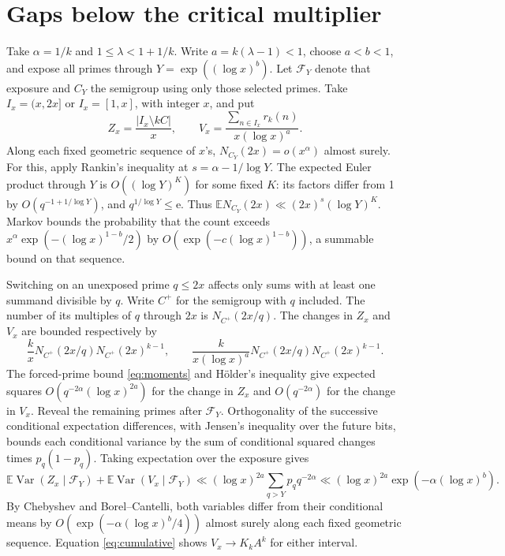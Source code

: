 \documentclass[11pt]{article}
\newcommand{\E}{\mathbb E}
\newcommand{\Var}{\operatorname{Var}}
\newcommand{\e}{\mathrm e}
\begin{document}
\section{Gaps below the critical multiplier}\label{sec:below}

Take \(\alpha=1/k\) and \(1\le\lambda<1+1/k\). Write
\(a=k(\lambda-1)<1\), choose \(a<b<1\), and expose all primes
through \(Y=\exp((\log x)^b)\). Let \(\mathcal F_Y\) denote that
exposure and \(C_Y\) the semigroup using only those selected
primes. Take \(I_x=(x,2x]\) or \(I_x=[1,x]\), with integer \(x\),
and put
\[
 Z_x=\frac{|I_x\setminus kC|}{x},\qquad
 V_x=\frac{\sum_{n\in I_x}r_k(n)}{x(\log x)^a}.
\]
Along each fixed geometric sequence of \(x\)'s,
\(N_{C_Y}(2x)=o(x^\alpha)\) almost surely. For this, apply
Rankin's inequality at \(s=\alpha-1/\log Y\). The expected
Euler product through \(Y\) is \(O((\log Y)^K)\) for some fixed
\(K\): its factors differ from 1 by \(O(q^{-1+1/\log Y})\),
and \(q^{1/\log Y}\le\e\). Thus
\(\E N_{C_Y}(2x)\ll(2x)^s(\log Y)^K\).
Markov bounds the probability that the count exceeds
\(x^\alpha \exp(-(\log x)^{1-b}/2)\) by
\(O(\exp(-c(\log x)^{1-b}))\), a summable bound on that sequence.

Switching on an unexposed prime \(q\le2x\) affects only sums with
at least one summand divisible by \(q\). Write \(C^+\) for the
semigroup with \(q\) included. The number of its multiples of
\(q\) through \(2x\) is \(N_{C^+}(2x/q)\).
The changes in \(Z_x\) and \(V_x\) are bounded respectively by
\[
 \frac{k}{x}N_{C^+}(2x/q)N_{C^+}(2x)^{k-1},
 \qquad
 \frac{k}{x(\log x)^a}N_{C^+}(2x/q)N_{C^+}(2x)^{k-1}.
\]
The forced-prime bound \eqref{eq:moments} and H\"older's inequality
give expected squares \(O(q^{-2\alpha}(\log x)^{2a})\) for the
change in \(Z_x\) and \(O(q^{-2\alpha})\) for the change in \(V_x\).
Reveal the remaining primes after \(\mathcal F_Y\).
Orthogonality of the successive conditional expectation
differences, with Jensen's inequality over the future bits,
bounds each conditional variance by the sum of conditional
squared changes times \(p_q(1-p_q)\).
Taking expectation over the exposure gives
\[
 \E\Var(Z_x\mid\mathcal F_Y)+\E\Var(V_x\mid\mathcal F_Y)
       \ll(\log x)^{2a}\sum_{q>Y}p_q q^{-2\alpha}
       \ll(\log x)^{2a} \exp(-\alpha(\log x)^b).
\]
By Chebyshev and Borel--Cantelli, both variables differ from
their conditional means by \(O(\exp(-\alpha(\log x)^b/4))\)
almost surely along each fixed geometric sequence. Equation
\eqref{eq:cumulative} shows \(V_x\to K_k A^k\) for either interval.
\end{document}
